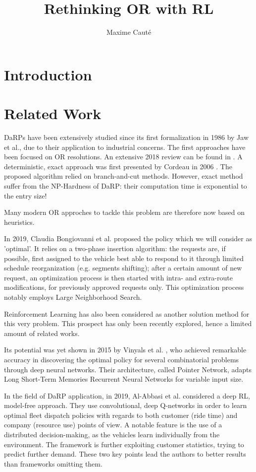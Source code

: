 \documentclass{article}
\title{Rethinking OR with RL}
\author{Maxime Cauté}
\begin{document}
\section{Introduction}

\section{Related Work}


DaRPs have been extensively studied since its first formalization in 1986 by Jaw et al.\cite{jaw1986heuristic}, due to their application to industrial concerns.
The first approaches have been focused on OR resolutions.
An extensive 2018 review can be found in \cite{ho2018survey}.
A deterministic, exact approach was first presented by Cordeau in 2006 \cite{cordeau2006branch}.
The proposed algorithm relied on branch-and-cut methods.
However, exact method suffer from the NP-Hardness of DaRP: their computation time is exponential to the entry size!

Many modern OR approches to tackle this problem are therefore now based on heuristics.

In 2019, Claudia Bongiovanni et al. \cite{bongiovannilearning} proposed the policy which we will consider as 'optimal'.
It relies on a two-phase insertion algorithm:
the requests are, if possible, first assigned to the vehicle best able to respond to it through limited schedule reorganization (e.g. segments shifting);
after a certain amount of new request, an optimization process is then started with intra- and extra-route modifications, for previously approved requests only.
This optimization process notably employs Large Neighborhood Search.

Reinforcement Learning has also been considered as another solution method for this very problem.
This prospect has only been recently explored, hence a limited amount of related works.

Its potential was yet shown in 2015 by Vinyals et al. \cite{vinyals2015pointer},
who achieved remarkable accuracy in discovering the optimal policy for several combinatorial problems through deep neural networks.
Their architecture, called Pointer Network, adapts Long Short-Term Memories Recurrent Neural Networks for variable input size.

In the field of DaRP application, in 2019, Al-Abbasi et al. \cite{al2019deeppool} considered a deep RL, model-free approach.
They use convolutional, deep Q-networks in order to learn optimal fleet dispatch policies
with regards to both customer (ride time) and company (resource use) points of view.
A notable feature is the use of a distributed decision-making, as
the vehicles learn individually from the environment.
The framework is further exploiting customer statistics, trying to predict further demand.
These two key points lead the authors to better results than frameworks omitting them.
\end{document}
